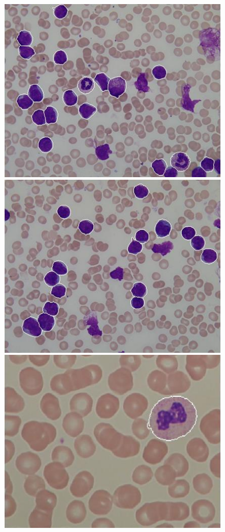 {	\begin{figure}[!htbp]
		\centering
		\includegraphics[height=0.23\textheight]{images/Fig16-006}\vspace{1mm}
		\includegraphics[height=0.23\textheight]{images/Fig16-015}
		\includegraphics[height=0.23\textheight]{images/Fig16-01}

\end{figure}}
